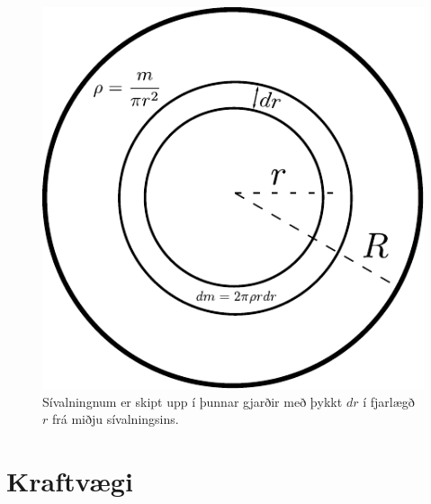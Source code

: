 \begin{figure}[H]
    \centering
    \includegraphics[scale=0.6]{momentsOfInertia/sivalninertia.pdf}
    \caption{Sívalningnum er skipt upp í þunnar gjarðir með þykkt $dr$ í fjarlægð $r$ frá miðju sívalningsins.}
\end{figure}

\newpage

\section{Kraftvægi}

